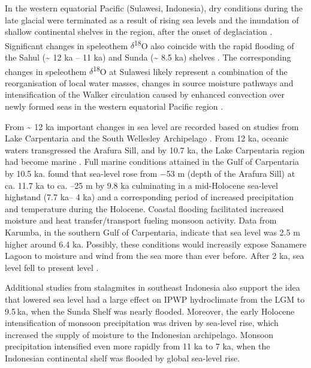 \documentclass[
  12pt,
]{book}
\begin{document}
In the western equatorial Pacific (Sulawesi, Indonesia), dry conditions during the late glacial were terminated as a result of rising sea levels and the inundation of shallow continental shelves in the region, after the onset of deglaciation \citep{dinezioEffectSeaLevel2013a, griffithsAbruptIncreaseEast2013}. Significant changes in speleothem \(\delta\)\textsuperscript{18}O also coincide with the rapid flooding of the Sahul (\textasciitilde{} 12 ka -- 11 ka) and Sunda (\textasciitilde{} 8.5 ka) shelves \citep{krauseSpatiotemporalEvolutionAustralasian2019}. The corresponding changes in speleothem \(\delta\)\textsuperscript{18}O at Sulawesi likely represent a combination of the reorganisation of local water masses, changes in source moisture pathways and intensification of the Walker circulation caused by enhanced convection over newly formed seas in the western equatorial Pacific region \citep{griffithsIncreasingAustralianIndonesian2009, dinezioEffectSeaLevel2013a, krauseSpatiotemporalEvolutionAustralasian2019}.

From \textasciitilde{} 12 ka important changes in sea level are recorded based on studies from Lake Carpentaria and the South Wellesley Archipelago \citep{slossHoloceneSealevelChange2018a}. From 12 ka, oceanic waters transgressed the Arafura Sill, and by 10.7 ka, the Lake Carpentaria region had become marine \citep{mccullochStrontiumIsotopeVariations1989a, chivasSealevelEnvironmentalChanges2001}. Full marine conditions attained in the Gulf of Carpentaria by 10.5 ka. \citet{slossHoloceneSealevelChange2018a} found that sea-level rose from −53 m (depth of the Arafura Sill) \citep{reevesSedimentaryRecordPalaeoenvironments2008, slossHoloceneSealevelChange2018a, harrisNewCoralReef2008} at ca. 11.7 ka to ca. --25 m by 9.8 ka \citep{slossHoloceneSealevelChange2018a} culminating in a mid-Holocene sea-level highstand (7.7 ka-- 4 ka) and a corresponding period of increased precipitation and temperature during the Holocene. Coastal flooding facilitated increased moisture and heat transfer/transport fueling monsoon activity. Data from Karumba, in the southern Gulf of Carpentaria, indicate that sea level was 2.5 m higher around 6.4 ka. Possibly, these conditions would increasily expose Sanamere Lagoon to moisture and wind from the sea more than ever before. After 2 ka, sea level fell to present level \citep{lewisPostglacialSealevelChanges2013a}.

Additional studies from stalagmites in southeast Indonesia \citep{griffithsIncreasingAustralianIndonesian2009} also support the idea that lowered sea level had a large effect on IPWP hydroclimate from the LGM to 9.5 ka, when the Sunda Shelf was nearly flooded. Moreover, the early Holocene intensification of monsoon precipitation was driven by sea-level rise, which increased the supply of moisture to the Indonesian archipelago. Monsoon precipitation intensified even more rapidly from 11 ka to 7 ka, when the Indonesian continental shelf was flooded by global sea-level rise.
\end{document}
